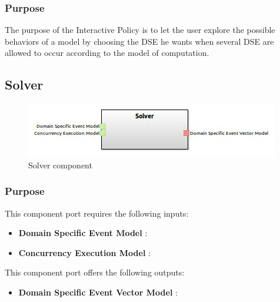 \documentclass{gemoc} %
\begin{document}
\subsubsection{Purpose}
The purpose of the Interactive Policy is to let the user explore the possible behaviors of a model by choosing the DSE he wants when several DSE are allowed to occur according to the model of computation.


\subsection{Solver}

\begin{figure}[htp]
	\begin{center}
	\includegraphics*[trim=0.0cm 0.0cm 0cm 0.0cm, clip=true, scale=1.0]{../images/generated/Generated_Solver.jpg}
	\caption{Solver component}
	\end{center}
\end{figure}

\subsubsection{Purpose}

This component port requires the following inputs:
\begin{itemize}
  \item \textbf{Domain Specific Event Model} :
  \item \textbf{Concurrency Execution Model} :
\end{itemize}

This component port offers the following outputs:
\begin{itemize}
  \item \textbf{Domain Specific Event Vector Model} :
\end{itemize}
\end{document}
